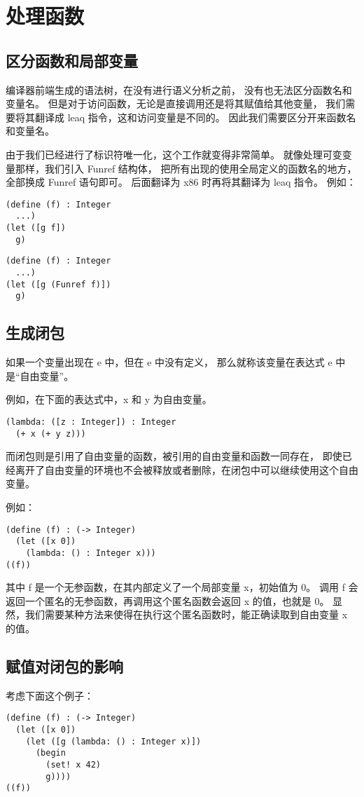 
\section{处理函数}

\subsection{区分函数和局部变量}

编译器前端生成的语法树，在没有进行语义分析之前，
没有也无法区分函数名和变量名。
但是对于访问函数，无论是直接调用还是将其赋值给其他变量，
我们需要将其翻译成 leaq 指令，这和访问变量是不同的。
因此我们需要区分开来函数名和变量名。

由于我们已经进行了标识符唯一化，这个工作就变得非常简单。
就像处理可变变量那样，我们引入 Funref 结构体，
把所有出现的使用全局定义的函数名的地方，全部换成 Funref 语句即可。
后面翻译为 x86 时再将其翻译为 leaq 指令。
例如：

\begin{transformation}
\begin{lstlisting}
(define (f) : Integer
  ...)
(let ([g f])
  g)
\end{lstlisting}
\compilesto
\begin{lstlisting}
(define (f) : Integer
  ...)
(let ([g (Funref f)])
  g)
\end{lstlisting}
\end{transformation}

\subsection{生成闭包}

如果一个变量出现在 e 中，但在 e 中没有定义，
那么就称该变量在表达式 e 中是“自由变量”。

例如，在下面的表达式中，x 和 y 为自由变量。
\begin{lstlisting}
(lambda: ([z : Integer]) : Integer
  (+ x (+ y z)))
\end{lstlisting}

而闭包则是引用了自由变量的函数，被引用的自由变量和函数一同存在，
即使已经离开了自由变量的环境也不会被释放或者删除，在闭包中可以继续使用这个自由变量。

例如：
\begin{lstlisting}
(define (f) : (-> Integer)
  (let ([x 0])
    (lambda: () : Integer x)))
((f))
\end{lstlisting}

其中 f 是一个无参函数，在其内部定义了一个局部变量 x，初始值为 0。
调用 f 会返回一个匿名的无参函数，再调用这个匿名函数会返回 x 的值，也就是 0。
显然，我们需要某种方法来使得在执行这个匿名函数时，能正确读取到自由变量 x 的值。




\subsection{赋值对闭包的影响}

考虑下面这个例子：

\begin{lstlisting}
(define (f) : (-> Integer)
  (let ([x 0])
    (let ([g (lambda: () : Integer x)])
      (begin
        (set! x 42)
        g))))
((f))
\end{lstlisting}



